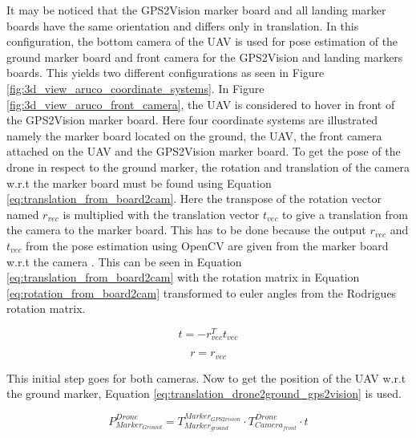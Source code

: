 \documentclass[../Head/report.tex]{subfiles}
\begin{document}
It may be noticed that the GPS2Vision marker board and all landing marker boards have the same orientation and differs only in translation. In this configuration, the bottom camera of the UAV is used for pose estimation of the ground marker board and front camera for the GPS2Vision and landing markers boards. This yields two different configurations as seen in Figure \ref{fig:3d_view_aruco_coordinate_systems}. In Figure \ref{fig:3d_view_aruco_front_camera}, the UAV is considered to hover in front of the GPS2Vision marker board. Here four coordinate systems are illustrated namely the marker board located on the ground, the UAV, the front camera attached on the UAV and the GPS2Vision marker board. To get the pose of the drone in respect to the ground marker, the rotation and translation of the camera w.r.t  the marker board must be found using Equation \ref{eq:translation_from_board2cam}. Here the transpose of the rotation vector named $r_{vec}$ is multiplied with the translation vector $t_{vec}$ to give a translation from the camera to the marker board. This has to be done because the output $r_{vec}$ and $t_{vec}$ from the pose estimation using OpenCV are given from the marker board w.r.t the camera \cite{theExtrinsicCameraMatrix}. This can be seen in Equation \ref{eq:translation_from_board2cam} with the rotation matrix in Equation \ref{eq:rotation_from_board2cam} transformed to euler angles from the Rodrigues rotation matrix. 

\begin{equation}
	t = -r_{vec}^T t_{vec} 
	\label{eq:translation_from_board2cam}  
\end{equation} 

\begin{equation}
	r = r_{vec} 
	\label{eq:rotation_from_board2cam}  
\end{equation} 

This initial step goes for both cameras. Now to get the position of the UAV w.r.t the ground marker, Equation \ref{eq:translation_drone2ground_gps2vision} is used.

\begin{equation}
	P^{Drone}_{Marker_{Ground}} = T^{Marker_{GPS2vision}}_{Marker_{ground}} \cdot T^{Drone}_{Camera_{front}} \cdot t
	\label{eq:translation_drone2ground_gps2vision} 
\end{equation}
\end{document}
